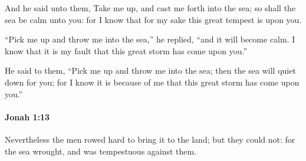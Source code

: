 			\begin{versebox}
					\item[BHS] 
					\item[LXX] 
					\item[ASV] And he said unto them, Take me up, and cast me forth into the sea; so shall the sea be calm unto you: for I know that for my sake this great tempest is upon you.
					\item[NIV] “Pick me up and throw me into the sea,” he replied, “and it will become calm. I know that it is my fault that this great storm has come upon you.”
					\item[NRSV] He said to them, “Pick me up and throw me into the sea; then the sea will quiet down for you; for I know it is because of me that this great storm has come upon you.”
			\end{versebox}

		\paragraph{Jonah 1:13} %
			\label{JONAH-1-13}

			Nevertheless the men rowed hard to bring it to the land; but they could not: for the sea wrought, and was tempestuous against them.

